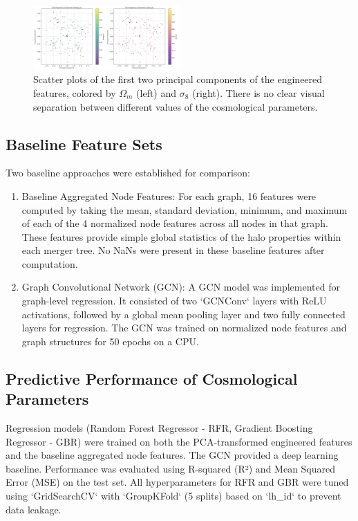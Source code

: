 \documentclass[twocolumn]{aastex631}
\begin{document}
\begin{figure}[h!]
    \centering
    \includegraphics[width=0.5\textwidth]{../input_files/plots/pca_projection_plot_6_20250527-135752.png}
    \caption{Scatter plots of the first two principal components of the engineered features, colored by $\Omega_m$ (left) and $\sigma_8$ (right). There is no clear visual separation between different values of the cosmological parameters.}
    \label{fig:pca_projection}
\end{figure}

\subsection{Baseline Feature Sets}

Two baseline approaches were established for comparison:
\begin{enumerate}
    \item Baseline Aggregated Node Features: For each graph, 16 features were computed by taking the mean, standard deviation, minimum, and maximum of each of the 4 normalized node features across all nodes in that graph. These features provide simple global statistics of the halo properties within each merger tree. No NaNs were present in these baseline features after computation.
    \item Graph Convolutional Network (GCN): A GCN model was implemented for graph-level regression. It consisted of two `GCNConv` layers with ReLU activations, followed by a global mean pooling layer and two fully connected layers for regression. The GCN was trained on normalized node features and graph structures for 50 epochs on a CPU.
\end{enumerate}

\subsection{Predictive Performance of Cosmological Parameters}

Regression models (Random Forest Regressor - RFR, Gradient Boosting Regressor - GBR) were trained on both the PCA-transformed engineered features and the baseline aggregated node features. The GCN provided a deep learning baseline. Performance was evaluated using R-squared (R²) and Mean Squared Error (MSE) on the test set. All hyperparameters for RFR and GBR were tuned using `GridSearchCV` with `GroupKFold` (5 splits) based on `lh_id` to prevent data leakage.
\end{document}
